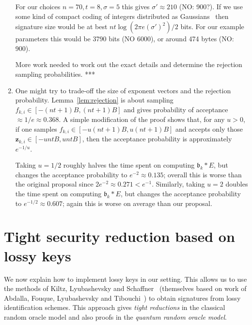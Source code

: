 \documentclass{llncs}
\renewcommand{\b}{\mathfrak{b}}
\newcommand{\z}{\mathbf{z}}
\begin{document}
\begin{enumerate}
For our choices $n=70, t = 8, \sigma = 5$ this gives $\sigma' \approx 210$ (NO: 900?).
If we use some kind of compact coding of integers distributed as Gaussians~\cite{DDLL13} then signature size would be at best $nt \log( 2 \pi e (\sigma')^2 )/2$ bits.
For our example parameters this would be 3790 bits (NO 6000), or around 474 bytes (NO: 900).

More work needed to work out the exact details and determine the rejection sampling probabilities. ***

\item One might try to trade-off the size of exponent vectors and the rejection probability. Lemma~\ref{lem:rejection} is about sampling $f_{k,i} \in [ -(nt+1)B, (nt+1)B ]$ and gives probability of acceptance $\approx 1/e \approx 0.368$.
A simple modification of the proof shows that, for any $u > 0$, if one samples $f_{k,i} \in [ -u(nt+1)B, u(nt+1)B ]$ and accepts only those $\z_{k,i} \in [ -untB, untB ]$, then the acceptance probability is approximately $e^{-1/u}$.

Taking $u = 1/2$ roughly halves the time spent on computing $\b_k * E$, but changes the acceptance probability to $e^{-2}  \approx 0.135$; overall this is worse than the original proposal since $2 e^{-2} \approx 0.271 < e^{-1}$.
Similarly, taking $u = 2$ doubles the time spent on computing $\b_k * E$, but changes the acceptance probability to $e^{-1/2} \approx 0.607$; again this is worse on average than our proposal.
\end{enumerate}


\section{Tight security reduction based on lossy keys}\label{sec:lossy-keys}


We now explain how to implement lossy keys in our setting.
This allows us to use the methods of Kiltz, Lyubashevsky and Schaffner~\cite{KLS18} (themselves based on work of Abdalla, Fouque, Lyubashevsky and Tibouchi~\cite{AFLT12}) to obtain signatures from lossy identification schemes. This approach gives \emph{tight reductions} in the classical random oracle model and also proofs in the \emph{quantum random oracle model}.
\end{document}

